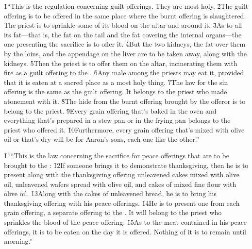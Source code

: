 \v{1}``This is the regulation concerning guilt offerings. They are most holy. \v{2}The guilt offering is to be offered in the same place where the burnt offering is slaughtered. The priest is to sprinkle some of its blood on the altar and around it. \v{3}As to all its fat---that is, the fat on the tail and the fat covering the internal organs---the one presenting the sacrifice is to offer it. \v{4}But the two kidneys, the fat over them by the loins, and the appendage on the liver are to be taken away, along with the kidneys. \v{5}Then the priest is to offer them on the altar, incinerating them with fire as a guilt offering to the . \v{6}Any male among the priests may eat it, provided that it is eaten at a sacred place as a most holy thing. \v{7}The law for the sin offering is the same as the guilt offering. It belongs to the priest who made atonement with it. \v{8}The hide from the burnt offering brought by the offeror is to belong to the priest. \v{9}Every grain offering that's baked in the oven and everything that's prepared in a stew pan or in the frying pan belongs to the priest who offered it. \v{10}Furthermore, every grain offering that's mixed with olive oil or that's dry will be for Aaron's sons, each one like the other.''

\v{11}``This is the law concerning the sacrifice for peace offerings that are to be brought to the : \v{12}If someone brings it to demonstrate thanksgiving, then he is to present along with the thanksgiving offering unleavened cakes mixed with olive oil, unleavened wafers spread with olive oil, and cakes of mixed fine flour with olive oil. \v{13}Along with the cakes of unleavened bread, he is to bring his thanksgiving offering with his peace offerings. \v{14}He is to present one from each grain offering, a separate offering to the . It will belong to the priest who sprinkles the blood of the peace offering. \v{15}As to the meat contained in his peace offerings, it is to be eaten on the day it is offered. Nothing of it is to remain until morning.''

